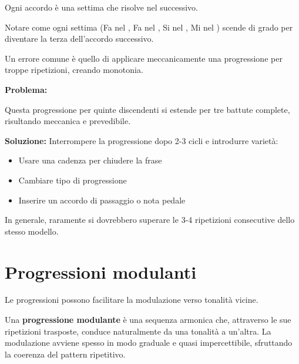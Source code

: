 \begin{esempio}
	\label{ex:progressione_settime}
	Ogni accordo è una settima che risolve nel successivo.
	
	Notare come ogni settima (Fa nel , Fa nel , Si nel , Mi nel ) scende di grado per diventare la terza dell'accordo successivo.
\end{esempio}

\begin{errore}
	\label{err:progressioni_lunghe}
	Un errore comune è quello di applicare meccanicamente una progressione per troppe ripetizioni, creando monotonia. 
	
	\textbf{Problema:}
	
	Questa progressione per quinte discendenti si estende per tre battute complete, risultando meccanica e prevedibile.
	
	\textbf{Soluzione:}
	Interrompere la progressione dopo 2-3 cicli e introdurre varietà:
	\begin{itemize}
		\item Usare una cadenza per chiudere la frase
		\item Cambiare tipo di progressione
		\item Inserire un accordo di passaggio o nota pedale
	\end{itemize}
	
	In generale, raramente si dovrebbero superare le 3-4 ripetizioni consecutive dello stesso modello.
\end{errore}

\section{Progressioni modulanti}
\label{sec:progressioni_modulanti}

Le progressioni possono facilitare la modulazione verso tonalità vicine.

\begin{definizione}
	\label{def:progressione_modulante}
	Una \textbf{progressione modulante} è una sequenza armonica che, attraverso le sue ripetizioni trasposte, conduce naturalmente da una tonalità a un'altra. La modulazione avviene spesso in modo graduale e quasi impercettibile, sfruttando la coerenza del pattern ripetitivo.
\end{definizione}

